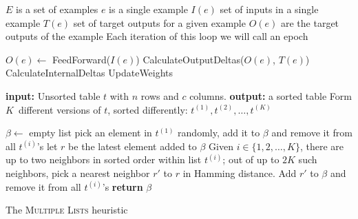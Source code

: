 \documentclass[11pt]{article}
\begin{document}
$E$ is a set of examples
$e$ is a single example
$I(e)$ set of inputs in a single example
$T(e)$ set of target outputs for a given example
$O(e)$ are the target outputs of the example
Each iteration of this loop we will call an epoch

\begin{algorithmic}
		\STATE $O(e) \gets$ FeedForward($I(e)$)
		\STATE CalculateOutputDeltas($O(e)$, $T(e)$)
		\STATE CalculateInternalDeltas
		\STATE UpdateWeights
	\ENDFOR
\end{algorithmic}

\begin{algorithm}
{
\begin{algorithmic}[1]
\STATE \textbf{input:}  Unsorted table $t$ with $n$ rows and $c$ columns.
\STATE \textbf{output:} a sorted table
\STATE Form
$K$~different versions of $t$, sorted differently: $t^{(1)},t^{(2)},\dots, t^{(K)}$ 

\STATE $\beta \leftarrow $ empty list
\STATE pick an element in $t^{(1)}$ randomly, add it to $\beta$ and remove it from all $t^{(i)}$'s
\STATE let $r$ be the latest element added to $\beta$
\STATE Given $i\in \{1,2,\dots,K\}$, there are up to two neighbors in sorted order within list $t^{(i)}$; out of up to $2K$ such neighbors, pick a nearest neighbor $r'$ to $r$ in Hamming distance.
\STATE Add $r'$ to $\beta$ and remove it from all $t^{(i)}$'s
\ENDWHILE
\STATE \textbf{return} $\beta$
\end{algorithmic}
}
\caption{\label{algo:multiplelists}The \textsc{Multiple Lists} heuristic}

\end{algorithm}
\end{document}
